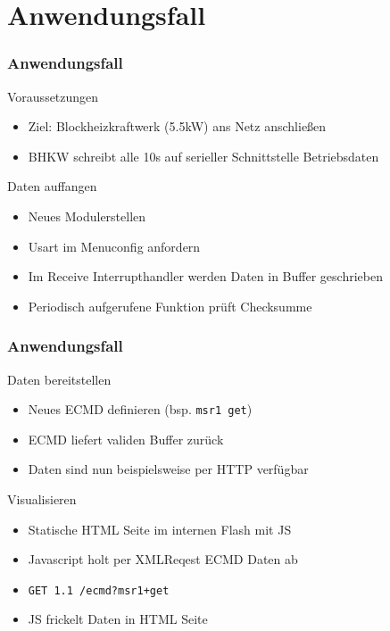 \documentclass[utf8, xcolor=dvipsnames]{beamer}
\renewcommand{\t}[1]{\texttt{#1}}
\begin{document}
\section{Anwendungsfall}
\begin{frame}
  \frametitle{Anwendungsfall}
  
  
  \begin{block}{Voraussetzungen}
    \begin{itemize}
    \item Ziel: Blockheizkraftwerk (5.5kW) ans Netz anschließen
    \item BHKW schreibt alle 10s auf serieller Schnittstelle Betriebsdaten
    \end{itemize}
  \end{block}

  
  \begin{block}{Daten auffangen}
    \begin{itemize}
    \item Neues Modulerstellen
    \item Usart im Menuconfig anfordern
    \item Im Receive Interrupthandler werden Daten in Buffer geschrieben
    \item Periodisch aufgerufene Funktion prüft Checksumme
    \end{itemize}
  \end{block}

\end{frame}


\begin{frame}
  \frametitle{Anwendungsfall}
  
  \begin{block}{Daten bereitstellen}
    \begin{itemize}
    \item Neues ECMD definieren (bsp. \t{msr1 get})
    \item ECMD liefert validen Buffer zurück
    \item Daten sind nun beispielsweise per HTTP verfügbar
    \end{itemize}
  \end{block}

  
  \begin{block}{Visualisieren}
    \begin{itemize}
    \item Statische HTML Seite im internen Flash mit JS
    \item Javascript holt per XMLReqest ECMD Daten ab
    \item \t{GET 1.1 /ecmd?msr1+get}
    \item JS frickelt Daten in HTML Seite
    \end{itemize}
  \end{block}
\end{frame}
\end{document}
